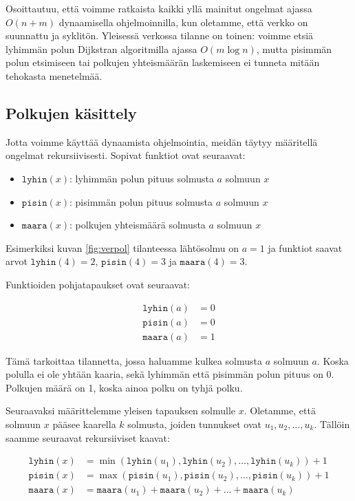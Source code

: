 Osoittautuu, että voimme ratkaista
kaikki yllä mainitut ongelmat
ajassa $O(n+m)$ dynaamisella ohjelmoinnilla,
kun oletamme, että verkko on suunnattu ja syklitön.
Yleisessä verkossa tilanne on toinen:
voimme etsiä lyhimmän polun Dijkstran algoritmilla
ajassa $O(m \log n)$, mutta pisimmän polun etsimiseen
tai polkujen yhteismäärän laskemiseen ei tunneta
mitään tehokasta menetelmää.

\subsection{Polkujen käsittely}

Jotta voimme käyttää dynaamista ohjelmointia,
meidän täytyy määritellä ongelmat rekursiivisesti.
Sopivat funktiot ovat seuraavat:

\begin{itemize}
\item $\texttt{lyhin}(x)$: lyhimmän polun pituus solmusta $a$ solmuun $x$
\item $\texttt{pisin}(x)$: pisimmän polun pituus solmusta $a$ solmuun $x$
\item $\texttt{maara}(x)$: polkujen yhteismäärä solmusta $a$ solmuun $x$
\end{itemize}

Esimerkiksi kuvan \ref{fig:verpol} tilanteessa lähtösolmu on $a=1$
ja funktiot saavat arvot $\texttt{lyhin}(4)=2$,
$\texttt{pisin}(4)=3$ ja $\texttt{maara}(4)=3$.

Funktioiden pohjatapaukset ovat seuraavat:

\begin{align*}
\texttt{lyhin}(a)&=0 \\
\texttt{pisin}(a)&=0 \\
\texttt{maara}(a)&=1
\end{align*}

Tämä tarkoittaa tilannetta, jossa haluamme kulkea solmusta $a$
solmuun $a$. Koska polulla ei ole yhtään kaaria,
sekä lyhimmän että pisimmän polun pituus on 0.
Polkujen määrä on 1, koska ainoa polku on tyhjä polku.

Seuraavaksi määrittelemme yleisen tapauksen solmulle $x$.
Oletamme, että solmuun $x$ pääsee kaarella $k$ solmusta,
joiden tunnukset ovat $u_1,u_2,\dots,u_k$.
Tällöin saamme seuraavat rekursiiviset kaavat:

\begin{align*}
\texttt{lyhin}(x)&=\min(\texttt{lyhin}(u_1),\texttt{lyhin}(u_2),\dots,\texttt{lyhin}(u_k))+1 \\
\texttt{pisin}(x)&=\max(\texttt{pisin}(u_1),\texttt{pisin}(u_2),\dots,\texttt{pisin}(u_k))+1 \\
\texttt{maara}(x)&=\texttt{maara}(u_1)+\texttt{maara}(u_2)+\dots+\texttt{maara}(u_k)
\end{align*}

